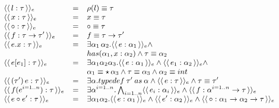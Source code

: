 \documentclass[a4paper,8pt]{article}
\newcommand{\constre}[1]{\ensuremath{\langle\langle\,#1\,\rangle\rangle_{e}}}
\begin{document}
     \begin{figure}[h]
       \[\small{
            \begin{array}{lcl}
                \constre{l : \tau} & = & \rho(l) \equiv \tau\\
                \constre{x : \tau} & = & x \equiv \tau \\
                \constre{\circ : \tau} & = & \circ \equiv \tau \\
                \constre{f : \tau\to \tau'} & = & f \equiv
                                                        \tau\to
                                                        \tau' \\
                \constre{e.x : \tau} & = & \exists
                                          \alpha_1\,\alpha_2. \constre{e
                                          : \alpha_1} \land \\
                          & & has(\alpha_1,x:\alpha_2) \land \tau
                              \equiv \alpha_2\\
                \constre{e[e_1] : \tau} & = & \exists
                                         \alpha_1\alpha_2\alpha_3. \constre{e:\alpha_1}
                                             \land\constre{e_1: \alpha_2}\land\\
                         & & \alpha_1\equiv\star\,\alpha_3 \land \tau
                             \equiv\alpha_3 \land \alpha_2 \equiv int\\
                \constre{(\tau')\,e:\tau} & = & \exists \alpha. typedef\:\tau'\:as\:\alpha\land\constre{e : \tau} \land
                                               \tau \equiv \tau'\\
                \constre{f(e^{i=1..n}) : \tau} & = & \exists
                                                    \alpha^{i=1..n}. \bigwedge_{i=1..n}\constre{e_i:\alpha_i}
                                                    \land \constre{f :
                                                    \alpha^{i=1..n}
                                                    \to \tau} \\
                     \constre{e \circ e' : \tau} & = & \exists
                                                      \alpha_1\alpha_2.\constre{e
                                                      :\alpha_1} \land
                                                      \constre{e' :
                                                      \alpha_2} \land
                                                      \constre{\circ :
                                                      \alpha_1\to\alpha_2\to\tau}\\

\end{array}}\]
\end{figure}
\end{document}
